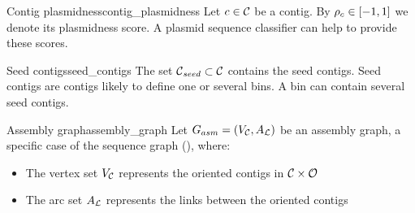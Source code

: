 \begin{definition}{Contig plasmidness}{contig_plasmidness}
  Let \(c \in \mathcal{C}{}\) be a contig.
  By \(\rho_{c} \in [-1, 1]\) we denote its plasmidness score.
  A plasmid sequence classifier can help to provide these scores.
\end{definition}

\begin{definition}{Seed contigs}{seed_contigs}
  The set \(\mathcal{C}{}_{seed}{} \subset \mathcal{C}{}\) contains the seed contigs.
  Seed contigs are contigs likely to define one or several bins.
  A bin can contain several seed contigs.
\end{definition}

\begin{definition}{Assembly graph}{assembly_graph}
  Let \(G_{asm} = (V_{\mathcal{C}{}}, A_{\mathcal{L}{}})\) be an assembly graph, a specific case of the sequence graph (), where:
  \begin{itemize}
    \item The vertex set \(V_{\mathcal{C}{}}\) represents the oriented contigs in \(\mathcal{C}{} \times \mathcal{O}{}\)
    \item The arc set \(A_{\mathcal{L}{}}\) represents the links between the oriented contigs
  \end{itemize}

\end{definition}